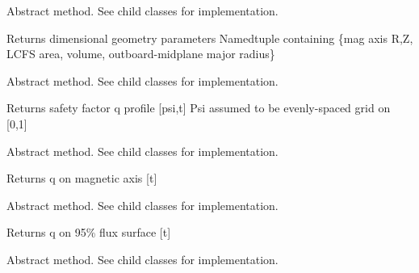 \documentclass[letterpaper,10pt,english]{sphinxmanual}
\begin{document}
\begin{fulllineitems}

\begin{fulllineitems}
\label{eqtools:eqtools.core.Equilibrium.getGeometry}
Abstract method.  See child classes for implementation.

Returns dimensional geometry parameters
Namedtuple containing \{mag axis R,Z, LCFS area, volume, outboard-midplane major radius\}

\end{fulllineitems}


\begin{fulllineitems}
\label{eqtools:eqtools.core.Equilibrium.getQProfile}
Abstract method.  See child classes for implementation.

Returns safety factor q profile {[}psi,t{]}
Psi assumed to be evenly-spaced grid on {[}0,1{]}

\end{fulllineitems}


\begin{fulllineitems}
\label{eqtools:eqtools.core.Equilibrium.getQ0}
Abstract method.  See child classes for implementation.

Returns q on magnetic axis {[}t{]}

\end{fulllineitems}


\begin{fulllineitems}
\label{eqtools:eqtools.core.Equilibrium.getQ95}
Abstract method.  See child classes for implementation.

Returns q on 95\% flux surface {[}t{]}

\end{fulllineitems}


\begin{fulllineitems}
\label{eqtools:eqtools.core.Equilibrium.getQLCFS}
Abstract method.  See child classes for implementation.


\end{fulllineitems}
\end{fulllineitems}
\end{document}
